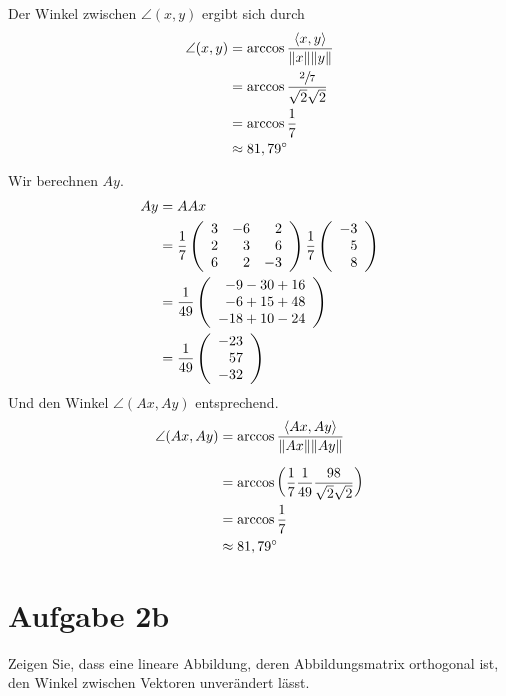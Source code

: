 \documentclass[main.tex]{subfiles}
\begin{document}
Der Winkel zwischen $\angle (x, y)$ ergibt sich durch
\begin{align*}
    \angle (x, y) &= \arccos \frac{\scalarprod{x, y}}{\norm{x}\norm{y}} \\
                  &= \arccos \frac{\sfrac{2}{7}}{\sqrt{2} \sqrt{2}} \\
                  &= \arccos \frac{1}{7} \\
                  &\approx 81,79^\circ
\end{align*}

Wir berechnen $Ay$.
\begin{align*}
    Ay &= AAx \\
       &= \frac{1}{7} \eqmatrix{rrr}{
        3 & -6 & 2 \\
        2 &  3 & 6 \\
        6 &  2 & -3
      } \frac{1}{7} \eqmatrix{r}{
        -3 \\
         5 \\
         8
      } \\
      &= \frac{1}{49} \eqmatrix{r}{
        -9 -30 + 16 \\
        -6 +15 + 48 \\
        -18 +10 -24
      }\\
      &= \frac{1}{49} \eqmatrix{r}{
        -23 \\
         57 \\
        -32
      }
\end{align*}
Und den Winkel $\angle (Ax, Ay)$ entsprechend.
\begin{align*}
    \angle (Ax, Ay) &= \arccos \frac{\scalarprod{Ax, Ay}}{\norm{Ax}\norm{Ay}} \\[2mm]
    &= \arccos \left( \frac{1}{7}\frac{1}{49} \frac{98}{\sqrt{2} \sqrt{2}} \right)\\
    &= \arccos \frac{1}{7} \\
    &\approx 81,79^\circ
\end{align*}


\section{Aufgabe 2b}
Zeigen Sie, dass eine lineare Abbildung, deren Abbildungsmatrix orthogonal ist, den
Winkel zwischen Vektoren unverändert lässt.
\end{document}

